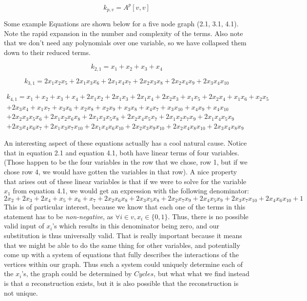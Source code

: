 $$k_{p, v} = A^p[v,v]$$

Some example Equations are shown below for a five node graph (2.1, 3.1, 4.1). 
Note the rapid expansion in the number and complexity of the terms.  
Also note that we don't need any polynomials over one variable, so we have collapsed them down to their reduced terms.

$$k_{2,1} = x_1 + x_2 + x_3 + x_4$$

$$k_{3,1} = 2x_1x_2x_5 + 2x_1x_3x_6 + 2x_1x_4x_7 + 2x_2x_3x_8 + 2x_2x_4x_9 + 2x_3x_4x_{10}$$

\begin{equation}\begin{aligned} k_{4,1} = x_1 + x_2 + x_3 + x_4 + 2x_1x_2 + 2x_1x_3 + 2x_1x_4 + 2x_2x_3 + x_1x_5 + 2x_2x_4 + x_1x_6 + x_2x_5 \\ + 2x_3x_4 + x_1x_7 + x_3x_6 + x_2x_8 + x_2x_9 + x_3x_8 + x_4x_7 + x_3x_{10} + x_4x_9 + x_4x_{10} \\ + 2x_2x_3x_5x_6 + 2x_1x_2x_6x_8 + 2x_1x_3x_5x_8 + 2x_2x_4x_5x_7 + 2x_1x_2x_7x_9 + 2x_1x_4x_5x_9 \\+ 2x_3x_4x_6x_7 + 2x_1x_3x_7x_{10} + 2x_1x_4x_6x_{10} + 2x_2x_3x_9x_{10} + 2x_2x_4x_8x_{10} + 2x_3x_4x_8x_9 \end{aligned}\end{equation}

An interesting aspect of these equations actually has a cool natural cause.  
Notice that in equation 2.1 and equation 4.1, both have linear terms of four variables.  
(Those happen to be the four variables in the row that we chose, row 1, but if we chose row 4, we would have gotten the variables in that row). 
A nice property that arises out of these linear variables is that if we were to solve for the variable $x_1$ from equation 4.1, we would get an expression with the following denominator: 
$$2x_2 + 2x_3 + 2x_4 + x_5 + x_6 + x_7 + 2x_2x_6x_8 + 2x_3x_5x_8 + 2x_2x_7x_9 + 2x_4x_5x_9 + 2x_3x_7x_{10} + 2x_4x_6x_{10} + 1$$
This is of particular interest, because we know that each one of the terms in this statement has to be \emph{non-negative}, as $\forall i \in v,  x_i \in \{0, 1\}$.  
Thus, there is no possible valid input of $x_i$'s which results in this denominator being zero, and our substitution is thus universally valid.  
That is really important because it means that we might be able to do the same thing for other variables, and potentially come up with a system of equations that fully describes the interactions of the vertices within our graph. 
Thus such a system could uniquely determine each of the $x_i$'s, the graph could be determined by $Cycles$, but what what we find instead is that $a$ reconstruction exists, but it is also possible that the reconstruction is not unique.

